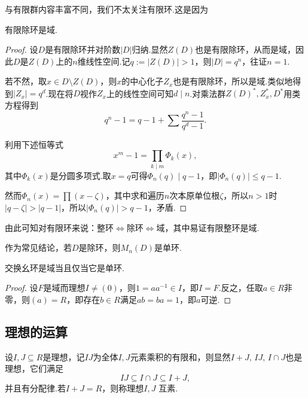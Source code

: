 与有限群内容丰富不同，我们不太关注有限环.这是因为
\begin{thm}[(Wedderburn)]
    有限除环是域.
\end{thm}
\begin{proof}
    设$D$是有限除环并对阶数$|D|$归纳.显然$Z(D)$也是有限除环，从而是域，因此$D$是$Z(D)$上的$n$维线性空间.记$q:=|Z(D)|>1$，则$|D|=q^n$，往证$n=1$.

    若不然，取$x\in D\setminus Z(D)$，则$x$的中心化子$Z_x$也是有限除环，所以是域.类似地得到$|Z_x|=q^d$.现在将$D$视作$Z_x$上的线性空间可知$d\mid n$.对乘法群$Z(D)^*,Z_x^*,D^*$用类方程得到
    \[
        q^n-1=q-1+\sum\frac{q^n-1}{q^d-1}.
    \]

    利用下述恒等式
    \[
        x^m-1=\prod_{k\mid m}\Phi_k(x),
    \]
    其中$\Phi_k(x)$是分圆多项式.取$x=q$可得$\Phi_n(q)\mid q-1$，即$|\Phi_n(q)|\le q-1$.

    然而$\Phi_n(x)=\prod(x-\zeta)$，其中求和遍历$n$次本原单位根$\zeta$，所以$n>1$时$|q-\zeta|>|q-1|$，所以$|\Phi_n(q)|>q-1$，矛盾.
\end{proof}
\begin{remark}
    由此可知对有限环来说：整环$\Leftrightarrow$除环$\Leftrightarrow$域，其中易证有限整环是域.
\end{remark}
\begin{remark}
    作为常见结论，若$D$是除环，则$M_n(D)$是单环.
\end{remark}

\begin{prop}
    交换幺环是域当且仅当它是单环.
\end{prop}
\begin{proof}
    设$F$是域而理想$I\ne(0)$，则$1=aa^{-1}\in I$，即$I=F$.反之，任取$a\in R$非零，则$(a)=R$，即存在$b\in R$满足$ab=ba=1$，即$a$可逆.
\end{proof}

\subsection{理想的运算}
设$I,J\subseteq R$是理想，记$IJ$为全体$I,J$元素乘积的有限和，则显然$I+J,\,IJ,\,I\cap J$也是理想，它们满足
\[
    IJ\subseteq I\cap J\subseteq I+J,
\]
并且有分配律.若$I+J=R$，则称理想$I,J$ {\heiti 互素}.

